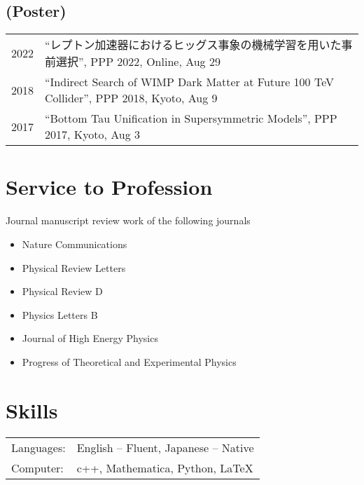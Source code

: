\documentclass[12pt]{article}
\begin{document}
\subsection*{(Poster)}
\begin{table}[H]\begin{tabular}{lp{6in}}2022 & ``レプトン加速器におけるヒッグス事象の機械学習を用いた事前選択'', PPP 2022, Online, Aug 29 \\2018 & ``Indirect Search of WIMP Dark Matter at Future 100 TeV Collider'', PPP 2018, Kyoto, Aug 9 \\2017 & ``Bottom Tau Unification in Supersymmetric Models'', PPP 2017, Kyoto, Aug 3 \\\end{tabular}\end{table}

\section*{Service to Profession}
\vspace*{1em}
Journal manuscript review work of the following journals
\begin{itemize}
  \setlength\itemsep{0em}
  \item Nature Communications
  \item Physical Review Letters
  \item Physical Review D
  \item Physics Letters B
  \item Journal of High Energy Physics
  \item Progress of Theoretical and Experimental Physics
\end{itemize}

\section*{Skills}
\begin{table}[H]
  \begin{tabular}{lp{6in}}
    Languages: & English -- Fluent, Japanese -- Native \\
    Computer: & c++, Mathematica, Python, LaTeX
  \end{tabular}
\end{table}
\end{document}
